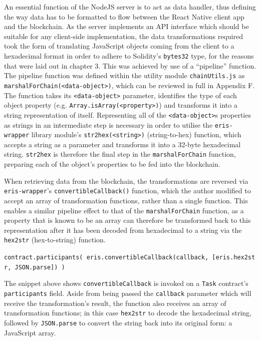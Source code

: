 An essential function of the NodeJS server is to act as data handler,
thus defining the way data has to be formatted to flow between the React
Native client app and the blockchain. As the server implements an API
interface which should be suitable for any client-side implementation,
the data transformations required took the form of translating
JavaScript objects coming from the client to a hexadecimal format in
order to adhere to Solidity's \texttt{bytes32} type, for the reasons
that were laid out in chapter 3. This was achieved by use of a
``pipeline'' function.\\
The pipeline function was defined within the utility module
\texttt{chainUtils.js} as
\texttt{marshalForChain(\textless{}data-object\textgreater{})}, which
can be reviewed in full in Appendix F. The function takes its
\texttt{\textless{}data-object\textgreater{}} parameter, identifies the
type of each object property (e.g.
\texttt{Array.isArray(\textless{}property\textgreater{})}) and
transforms it into a string representation of itself. Representing all
of the \texttt{\textless{}data-object\textgreater{}}s properties as
strings in an intermediate step is necessary in order to utilise the
\texttt{eris-wrapper} library module's
\texttt{str2hex(\textless{}string\textgreater{})} (string-to-hex)
function, which accepts a string as a parameter and transforms it into a
32-byte hexadecimal string. \texttt{str2hex} is therefore the final step
in the \texttt{marshalForChain} function, preparing each of the object's
properties to be fed into the blockchain.

When retrieving data from the blockchain, the transformations are
reversed via \texttt{eris-wrapper}'s \texttt{convertibleCallback()}
function, which the author modified to accept an array of transformation
functions, rather than a single function. This enables a similar
pipeline effect to that of the \texttt{marshalForChain} function, as a
property that is known to be an array can therefore be transformed back
to this representation after it has been decoded from hexadecimal to a
string via the \texttt{hex2str} (hex-to-string) function.

\texttt{contract.participants(\ eris.convertibleCallback(callback,\ {[}eris.hex2str,\ JSON.parse{]})\ )}

The snippet above shows \texttt{convertibleCallback} is invoked on a
\texttt{Task} contract's \texttt{participants} field. Aside from being
passed the \texttt{callback} parameter which will receive the
transformation's result, the function also receives an array of
transformation functions; in this case \texttt{hex2str} to decode the
hexadecimal string, followed by \texttt{JSON.parse} to convert the
string back into its original form: a JavaScript array.

